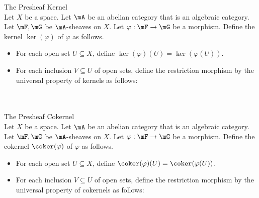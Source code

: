 \documentclass[a4paper]{article}
\begin{document}
\begin{defn}{The Presheaf Kernel}{}\\
Let $X$ be a space. Let $\mA$ be an abelian category that is an algebraic category. Let $\mF,\mG$ be $\mA$-sheaves on $X$. Let $\varphi:\mF\to\mG$ be a morphism. Define the kernel $\ker(\varphi)$ of $\varphi$ as follows. 
\begin{itemize}
\item For each open set $U\subseteq X$, define $\ker(\varphi)(U)=\ker(\varphi(U))$. 
\item For each inclusion $V\subseteq U$ of open sets, define the restriction morphism by the universal property of kernels as follows: \\
 \\~\\
\end{itemize}
\end{defn}

\begin{defn}{The Presheaf Cokernel}{}\\
Let $X$ be a space. Let $\mA$ be an abelian category that is an algebraic category. Let $\mF,\mG$ be $\mA$-sheaves on $X$. Let $\varphi:\mF\to\mG$ be a morphism. Define the cokernel $\coker(\varphi)$ of $\varphi$ as follows. 
\begin{itemize}
\item For each open set $U\subseteq X$, define $\coker(\varphi)(U)=\coker(\varphi(U))$. 
\item For each inclusion $V\subseteq U$ of open sets, define the restriction morphism by the universal property of cokernels as follows: \\
 \\~\\
\end{itemize}
\end{defn}
\end{document}
